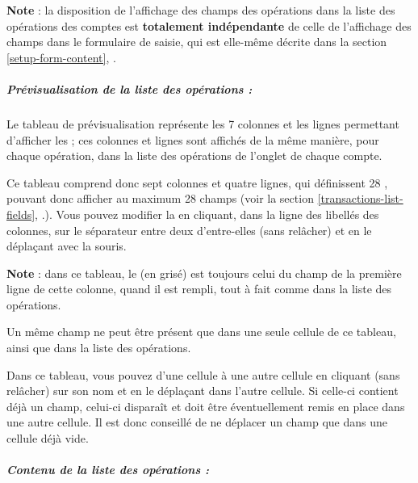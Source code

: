\textbf{Note} : la disposition de l'affichage des champs des opérations dans la liste des opérations des comptes est \textbf{totalement indépendante} de celle de  l'affichage des champs dans le formulaire de saisie, qui est elle-même décrite dans la section \vref{setup-form-content}, .

\ifIllustration
\else
\fi


\subparagraph{Prévisualisation de la liste des opérations :\label{setup-operations-cells-display}}

Le tableau de prévisualisation représente les 7 colonnes et les lignes permettant d'afficher les  ; ces colonnes et lignes sont affichés de la même manière, pour chaque opération, dans la liste des opérations de l'onglet  de chaque compte.

Ce tableau comprend donc sept colonnes et quatre lignes, qui définissent 28 , pouvant donc afficher au maximum 28 champs (voir la section \vref{transactions-list-fields}, .). Vous pouvez modifier la  en cliquant, dans la ligne des libellés des colonnes, sur le séparateur entre deux d'entre-elles (sans relâcher) et en le déplaçant avec la souris.

\textbf{Note} : dans ce tableau, le  (en grisé) est toujours celui du champ de la première ligne de cette colonne, quand il est rempli, tout à fait comme dans la liste des opérations.

Un même champ ne peut être présent que dans une seule cellule de ce tableau, ainsi que dans la liste des opérations.

Dans ce tableau, vous pouvez 
 d'une cellule à une autre cellule en cliquant (sans relâcher) sur son nom et en le déplaçant dans l'autre cellule. Si celle-ci contient déjà un champ, celui-ci disparaît et doit être éventuellement remis en place dans une autre cellule. Il est donc conseillé de ne déplacer un champ que dans une cellule déjà vide.


\subparagraph{Contenu de la liste des opérations :}

